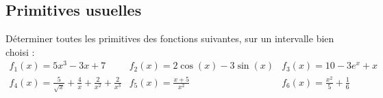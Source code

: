 
\newcommand{\mtn}{\mathbb{N}}
\newcommand{\mtns}{\mathbb{N}^*}
\newcommand{\mtz}{\mathbb{Z}}
\newcommand{\mtr}{\mathbb{R}}
\newcommand{\mtk}{\mathbb{K}}
\newcommand{\mtq}{\mathbb{Q}}
\newcommand{\mtc}{\mathbb{C}}
\newcommand{\mch}{\mathcal{H}}
\newcommand{\mcp}{\mathcal{P}}
\newcommand{\mcb}{\mathcal{B}}
\newcommand{\mcl}{\mathcal{L}}
\newcommand{\mcm}{\mathcal{M}}
\newcommand{\mcc}{\mathcal{C}}
\newcommand{\mcmn}{\mathcal{M}}
\newcommand{\mcmnr}{\mathcal{M}_n(\mtr)}
\newcommand{\mcmnk}{\mathcal{M}_n(\mtk)}
\newcommand{\mcsn}{\mathcal{S}_n}
\newcommand{\mcs}{\mathcal{S}}
\newcommand{\mcd}{\mathcal{D}}
\newcommand{\mcsns}{\mathcal{S}_n^{++}}
\newcommand{\glnk}{GL_n(\mtk)}
\newcommand{\mnr}{\mathcal{M}_n(\mtr)}
\newcommand{\veps}{\varepsilon}
\newcommand{\mcu}{\mathcal{U}}
\newcommand{\mcun}{\mcu_n}
\newcommand{\dis}{\displaystyle}
\newcommand{\croouv}{[\![}
\newcommand{\crofer}{]\!]}
\newcommand{\rab}{\mathcal{R}(a,b)}
\newcommand{\pss}[2]{\langle #1,#2\rangle}






\vspace{1em}

\subsection{Primitives usuelles}

Déterminer toutes les primitives des fonctions suivantes, sur un intervalle bien choisi : 
$$\begin{array}{lll}
\displaystyle f_1(x)=5x^3-3x+7&\displaystyle f_2(x)=2\cos(x)-3\sin(x)&\displaystyle f_3(x)=10-3e^x+x\\
\displaystyle f_4(x)=\frac{5}{\sqrt x}+\frac 4x+\frac{2}{x^2}+\frac{2}{x^3}&\displaystyle f_5(x)=\frac{x+5}{x^2}&\displaystyle f_6(x)=\frac{x^2}{5}+\frac 1{6}\\
\end{array}$$

